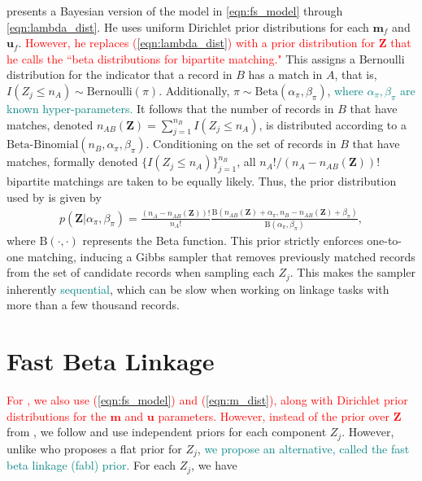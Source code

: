 \documentclass[ba]{imsart}
\begin{document}
\cite{sadinle_bayesian_2017} presents a Bayesian version of the model in \eqref{eqn:fs_model} through \eqref{eqn:lambda_dist}.  He uses uniform Dirichlet prior distributions for each $\bm{m}_f$ and $\bm{u}_f$.  \textcolor{red}{However, he replaces (\ref{eqn:lambda_dist}) with a prior distribution for $\mathbf{Z}$ that he calls the ``beta distributions for bipartite matching."}
%
This assigns a Bernoulli distribution for the indicator that a record in $B$ has a match in $A$, that is, $I(Z_j \leq n_A) \sim \text{Bernoulli}(\pi)$.  Additionally, $\pi \sim \text{Beta}(\alpha_{\pi}, \beta_{\pi})$, \textcolor{teal}{where  $\alpha_{\pi}, \beta_{\pi}$ are known hyper-parameters.}
%
It follows that the number of records in $B$ that have matches, denoted $n_{AB}(\bm{Z}) = \sum_{j=1}^{n_B} I(Z_j \leq n_A)$, is distributed according to a $\text{Beta-Binomial}(n_B, \alpha_{\pi}, \beta_{\pi})$. Conditioning on the set of records in $B$ that have matches, formally denoted $\{I(Z_j \leq n_A)\}_{j=1}^{n_B}$, all $n_A ! / (n_A - n_{AB}(\bm{Z}))!$ bipartite matchings are taken to be equally likely. Thus, the prior distribution used by \cite{sadinle_bayesian_2017} is given by
\begin{align}
\label{eqn:sadinle_prior}
p(\bm{Z}|\alpha_{\pi}, \beta_{\pi}) = \frac{(n_A - n_{AB}(\bm{Z}))!}{n_A !}\frac{\text{B}(n_{AB}(\bm{Z}) + \alpha_{\pi}, n_B - n_{AB}(\bm{Z}) + \beta_{\pi})}{\text{B}(\alpha_{\pi}, \beta_{\pi})},
\end{align}
where $\text{B}(\cdot, \cdot)$ represents the Beta function. This prior strictly enforces one-to-one matching, inducing a Gibbs sampler that removes previously matched records from the set of candidate records when sampling each $Z_j$. This makes the sampler inherently \textcolor{teal}{sequential}, which can be slow when working on linkage tasks with more than a few thousand records. 


\section{Fast Beta Linkage}
\label{sec:fast-beta-linkage}

\textcolor{red}{For , we also use (\ref{eqn:fs_model}) and (\ref{eqn:m_dist}), along with Dirichlet prior distributions for the $\mathbf{m}$ and $\mathbf{u}$ parameters.  However, instead of the prior over $\bm{Z}$}
from \cite{sadinle_bayesian_2017}, we follow \cite{wortman2019} and use independent priors for each component $Z_j$. However, unlike \cite{wortman2019} who proposes a flat prior for $Z_j$, 
\textcolor{teal}{we propose an alternative, called the fast beta linkage (fabl) prior.}
For each $Z_j$, we have
\end{document}
